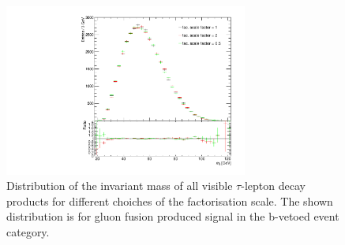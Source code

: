 \begin{figure}[tdp]
\begin{center}
\includegraphics[width=8cm]{figure/facs_mll_bveto}
\end{center}
\caption{ Distribution of the invariant mass of all visible $\tau$-lepton decay products 
for different choiches of the factorisation scale. The shown distribution is 
for gluon fusion produced signal in the b-vetoed event category.}
\label{fig:theory_mass}
\end{figure}


